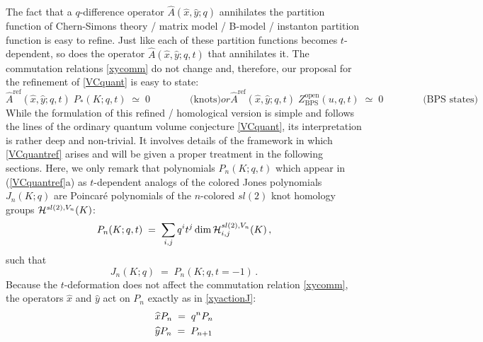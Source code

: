 \documentclass[hyper,letterpaper]{JHEP3}
\newcommand{\be}{\begin{equation}}
\newcommand{\ee}{\end{equation}}
\newcommand{\cH}{{\cal H }}
\renewcommand{\hat}{\widehat}
\begin{document}
The fact that a $q$-difference operator $\hat A (\hat x, \hat y; q)$ annihilates the partition function
of Chern-Simons theory / matrix model / B-model / instanton partition function is easy to refine.
Just like each of these partition functions becomes $t$-dependent,
so does the operator $\hat A (\hat x, \hat y; q,t)$ that annihilates it.
The commutation relations \eqref{xycomm} do not change and, therefore,
our proposal for the refinement of \eqref{VCquant} is easy to state:
\begin{subequations}\label{VCquantref}
\be
\hat A^{\text{ref}} (\hat x, \hat y; q, t) \; P_* (K;q,t) \; \simeq \; 0 \qquad \qquad \text{(knots)}
\ee
or
\be
\hat A^{\text{ref}} (\hat x, \hat y; q, t) \; Z_{\text{BPS}}^{\text{open}} (u,q,t) \; \simeq \; 0 \qquad \qquad \text{(BPS states)}
\ee
\end{subequations}
While the formulation of this refined / homological version is simple and follows the lines
of the ordinary quantum volume conjecture \eqref{VCquant}, its interpretation is rather deep and non-trivial.
It involves details of the framework in which \eqref{VCquantref} arises and will be given a proper treatment in the following sections.
Here, we only remark that polynomials $P_n (K;q,t)$ which appear in (\ref{VCquantref}a) as $t$-dependent analogs
of the colored Jones polynomials $J_n (K;q)$ are Poincar\'e polynomials of the $n$-colored $sl(2)$ knot homology groups $\cH^{sl(2),V_n} (K)$:
\be
P_n (K;q,t) \; = \; \sum_{i,j} q^i t^j \dim \cH_{i,j}^{sl(2),V_n} (K) \,,
\label{Pnoptimistic}
\ee
such that
\be
J_n (K;q) \; = \; P_n (K;q,t=-1) \,.
\ee
Because the $t$-deformation does not affect the commutation relation \eqref{xycomm},
the operators $\hat x$ and $\hat y$ act on $P_n$ exactly as in \eqref{xyactionJ}:
\begin{align}
& \hat x P_n \; = \; q^n P_n \label{xyactionP} \\
& \hat y P_n \; = \; P_{n+1} \notag
\end{align}
\end{document}
